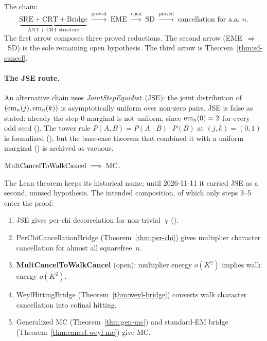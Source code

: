 \noindent The chain:
\[
  \underbrace{\mathrm{SRE} + \mathrm{CRT} + \mathrm{Bridge}}_{\text{ANT + CRT structure}}
  \;\xrightarrow{\text{proved}}\;
  \mathrm{EME}
  \;\xrightarrow{\text{open}}\;
  \mathrm{SD}
  \;\xrightarrow{\text{proved}}\;
  \text{cancellation for a.a.~}n.
\]
The first arrow composes three proved reductions.  The second arrow
(EME~$\Rightarrow$~SD) is the sole remaining open hypothesis.  The
third arrow is Theorem~\ref{thm:sd-cancel}.

\paragraph{The JSE route.}
An alternative chain uses \emph{JointStepEquidist}~(JSE): the joint
distribution of $(\mathrm{em}_{n}(j), \mathrm{em}_{n}(k))$
is asymptotically uniform over non-zero pairs.  JSE is false as
stated: already the step-$0$ marginal is not uniform, since
$\mathrm{em}_{n}(0) = 2$ for every odd seed
().  The
tower rule $P(A, B) = P(A \mid B) \cdot P(B)$ at $(j,k) = (0,1)$ is
formalized
(),
but the base-case theorem that combined it with a uniform marginal
()
is archived as vacuous.

\begin{theorem}
$\mathrm{MultCancelToWalkCancel} \;\Longrightarrow\; \mathrm{MC}$.
\end{theorem}

\noindent The Lean theorem keeps its historical name; until 2026-11-11
it carried JSE as a second, unused hypothesis.  The intended
composition, of which only steps 3--5 enter the proof:
\begin{enumerate}[nosep]
\item JSE gives per-chi decorrelation for non-trivial~$\chi$
  ().
\item PerChiCancellationBridge (Theorem~\ref{thm:per-chi}) gives
  multiplier character cancellation for almost all squarefree~$n$.
\item \textbf{MultCancelToWalkCancel} (open): multiplier energy
  $o(K^2)$ implies walk energy $o(K^2)$.
\item WeylHittingBridge (Theorem~\ref{thm:weyl-bridge}) converts walk
  character cancellation into cofinal hitting.
\item Generalized MC (Theorem~\ref{thm:gen-mc}) and standard-EM
  bridge (Theorem~\ref{thm:cancel-weyl-mc}) give MC\@.
\end{enumerate}

